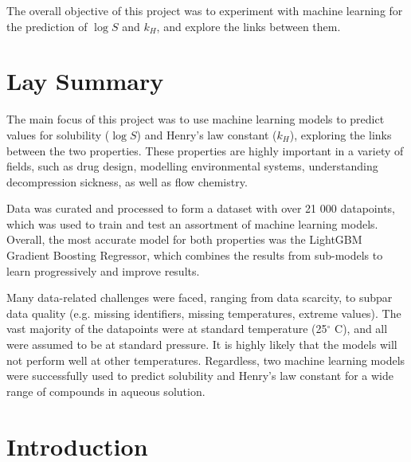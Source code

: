 \documentclass[11pt, titlepage]{article}
\begin{document}
The overall objective of this project was to experiment with machine learning for the prediction of {$\log S$} and {$k_H$}, and explore the links between them.

\section{Lay Summary}
\label{sec:LaySummary}

The main focus of this project was to use machine learning models to predict values for solubility ($\log S$) and Henry's law constant ($k_H$), exploring the links between the two properties. These properties are highly important in a variety of fields, such as drug design\cite{DrugSolubility}, modelling environmental systems\cite{EnvironmentHL}, understanding decompression sickness\cite{GasLaws}, as well as flow chemistry\cite{FlowChemistry}.

Data was curated and processed to form a dataset with over 21 000 datapoints, which was used to train and test an assortment of machine learning models. Overall, the most accurate model for both properties was the LightGBM Gradient Boosting Regressor\cite{LGBMRegressor}, which combines the results from sub-models to learn progressively and improve results. 

Many data-related challenges were faced, ranging from data scarcity, to subpar data quality (e.g. missing identifiers, missing temperatures, extreme values). The vast majority of the datapoints were at standard temperature (25$^\circ$ C), and all were assumed to be at standard pressure. It is highly likely that the models will not perform well at other temperatures. Regardless, two machine learning models were successfully used to predict solubility and Henry's law constant for a wide range of compounds in aqueous solution.

\section{Introduction}
\label{sec:Introduction}
\end{document}
